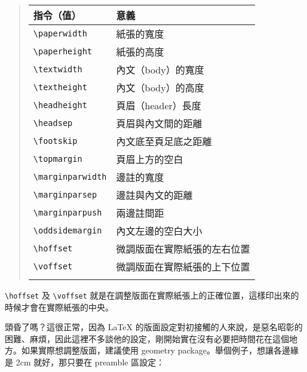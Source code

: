 \begin{quote}
   \begin{tabular}{ll}
      指令（值）              & 意義                         \\
      \hline
      \verb=\paperwidth=  & 紙張的寬度                   \\
      \verb=\paperheight=  & 紙張的高度                   \\
      \verb=\textwidth=  & 內文（body）的寬度           \\
      \verb=\textheight= & 內文（body）的高度           \\
      \verb=\headheight= & 頁眉（header）長度           \\
      \verb=\headsep= & 頁眉與內文間的距離           \\
      \verb=\footskip= & 內文底至頁足底之距離         \\
      \verb=\topmargin= & 頁眉上方的空白               \\
      \verb=\marginparwidth= & 邊註的寬度                   \\
      \verb=\marginparsep= & 邊註與內文的距離             \\
      \verb=\marginparpush= & 兩邊註間距                   \\
      \verb=\oddsidemargin= & 內文左邊的空白大小           \\
      \verb=\hoffset= & 微調版面在實際紙張的左右位置 \\
      \verb=\voffset= & 微調版面在實際紙張的上下位置 \\
      \index{paperwidth@\verb=\paperwidth=}\index{paperheight@\verb=\paperheight=}%
      \index{textwidth@\verb=\textwidth=}\index{textheight@\verb=\textheight=}%
      \index{headheight@\verb=\headheight=}\index{headsep@\verb=\headsep=}%
      \index{footskip@\verb=\footskip=}\index{topmargin@\verb=\topmargin=}%
      \index{marginparwidth@\verb=\marginparwidth=}\index{marginparsep@\verb=\marginparsep=}%
      \index{marginparpush@\verb=\marginparpush=}%
      \index{oddsidemargin@\verb=\oddsidemargin=}%
      \index{hoffset@\verb=\hoffset=}\index{voffset@\verb=\voffset=}%
   \end{tabular}
\end{quote}

\verb|\hoffset| 及 \verb|\voffset| 就是在調整版面在實際紙張上的正確位置，這樣印出來的時候才會在實際紙張的中央。

頭昏了嗎？這很正常，因為 \LaTeX{} 的版面設定對初接觸的人來說，是惡名昭彰的困難、麻煩，因此這裡不多談他的設定，剛開始實在沒有必要把時間花在這個地方。如果實際想調整版面，建議使用 {\sffamily geometry} package。舉個例子，想讓各邊緣是 2cm 就好，那只要在 preamble 區設定：


